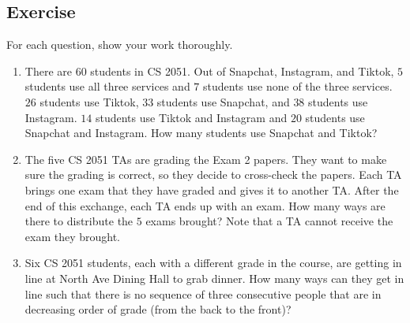 \documentclass{article}
\newcounter{counter}
\newcommand{\Exercise}{Exercise \stepcounter{counter}\thecounter}
\begin{document}
\subsection*{\Exercise}
    For each question, show your work thoroughly.
    \begin{enumerate}
        \item There are $60$ students in CS 2051. Out of Snapchat, Instagram, and Tiktok, $5$ students use all three services and $7$ students use none of the three services. $26$ students use Tiktok, $33$ students use Snapchat, and $38$ students use Instagram. $14$ students use Tiktok and Instagram and $20$ students use Snapchat and Instagram. How many students use Snapchat and Tiktok?
        \item The five CS 2051 TAs are grading the Exam 2 papers. They want to make sure the grading is correct, so they decide to cross-check the papers. Each TA brings one exam that they have graded and gives it to another TA. After the end of this exchange, each TA ends up with an exam. How many ways are there to distribute the $5$ exams brought? Note that a TA cannot receive the exam they brought.
        \item Six CS 2051 students, each with a different grade in the course, are getting in line at North Ave Dining Hall to grab dinner. How many ways can they get in line such that there is no sequence of three consecutive people that are in decreasing order of grade (from the back to the front)?
    \end{enumerate}
    
\end{document}
